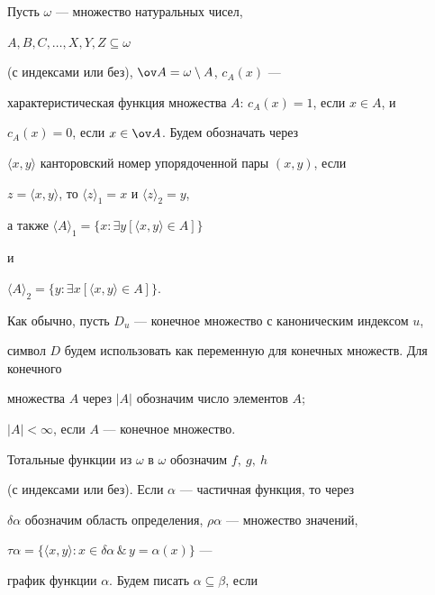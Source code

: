 \pagestyle{plain} %







\maketitle


\label{begin}








Пусть $\omega$ --- множество натуральных чисел,


$A,B,C,\dotsc,X,Y,Z\subseteq\omega$


(с индексами или без), $\ov A=\omega\setminus A$, $c_A(x)$ ---


характеристическая функция множества $A$: $c_A(x)=1$, если $x\in A$, и


$c_A(x)=0$, если $x\in\ov A$. Будем обозначать через


$\langle x,y\rangle$ канторовский номер упорядоченной пары $(x,y)$, если


$z{=}\langle x,y\rangle$, то $\langle z\rangle_1{=}x$ и $\langle z\rangle_2{=}y$,


а также $\langle A\rangle_1{=}\{x:\exists y[\langle x,y\rangle\in A]\}$


и


$\langle A\rangle_2{=}\{y:\exists x[\langle x,y\rangle\in A]\}$.


Как обычно, пусть $D_u$ --- конечное множество с каноническим индексом $u$,


символ $D$ будем использовать как переменную для конечных множеств. Для конечного


множества $A$ через $| A|$ обозначим число элементов $A$;


$| A|<\infty$, если $A$ --- конечное множество.


Тотальные функции из $\omega$ в $\omega$ обозначим $f,\ g,\ h$


(с индексами или без). Если $\alpha$ --- частичная функция, то через


$\delta\alpha$ обозначим область определения, $\rho\alpha$ --- множество значений,


$\tau\alpha=\{\langle x,y\rangle:x\in\delta\alpha\,\&\, y=\alpha(x)\}$ ---


график функции $\alpha$. Будем писать $\alpha\subseteq\beta$, если


